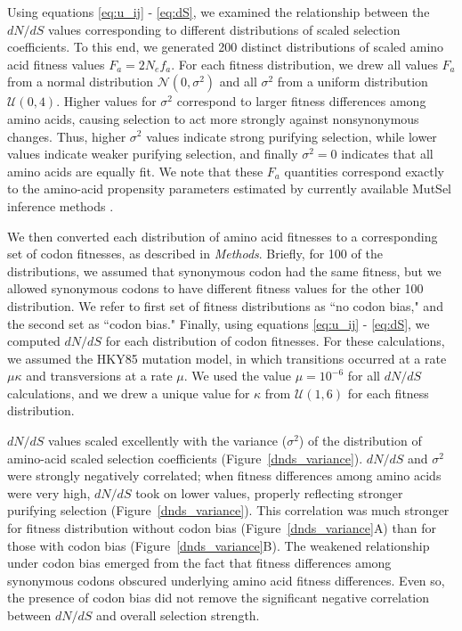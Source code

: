 \documentclass[11pt]{article}
\begin{document}
Using equations \eqref{eq:u_ij} - \eqref{eq:dS}, we examined the relationship between the $dN/dS$ values corresponding to different distributions of scaled selection coefficients. To this end, we generated 200 distinct distributions of scaled amino acid fitness values $F_a = 2N_ef_a$. For each fitness distribution, we drew all values $F_a$ from a normal distribution $\mathcal{N}(0,\sigma^2)$ and all $\sigma^2$ from a uniform distribution $\mathcal{U}(0,4)$. Higher values for $\sigma^2$ correspond to larger fitness differences among amino acids, causing selection to act more strongly against nonsynonymous changes. Thus, higher $\sigma^2$ values indicate strong purifying selection, while lower values indicate weaker purifying selection, and finally $\sigma^2 = 0$ indicates that all amino acids are equally fit. We note that these $F_a$ quantities correspond exactly to the amino-acid propensity parameters estimated by currently available MutSel inference methods \cite{RodrigueLartillot2014,Tamurietal2014}.

We then converted each distribution of amino acid fitnesses to a corresponding set of codon fitnesses, as described in \emph{Methods}. Briefly, for 100 of the distributions, we assumed that synonymous codon had the same fitness, but we allowed synonymous codons to have different fitness values for the other 100 distribution. We refer to first set of fitness distributions as ``no codon bias," and the second set as ``codon bias." Finally, using equations \eqref{eq:u_ij} - \eqref{eq:dS}, we computed $dN/dS$ for each distribution of codon fitnesses. For these calculations, we assumed the HKY85 \cite{HKY85} mutation model, in which transitions occurred at a rate $\mu\kappa$ and transversions at a rate $\mu$. We used the value $\mu = 10^{-6}$ for all $dN/dS$ calculations, and we drew a unique value for $\kappa$ from $\mathcal{U}(1,6)$ for each fitness distribution.

$dN/dS$ values scaled excellently with the variance ($\sigma^2$) of the distribution of amino-acid scaled selection coefficients (Figure~\ref{dnds_variance}). $dN/dS$ and $\sigma^2$ were strongly negatively correlated; when fitness differences among amino acids were very high, $dN/dS$ took on lower values, properly reflecting stronger purifying selection (Figure~\ref{dnds_variance}). This correlation was much stronger for fitness distribution without codon bias (Figure~\ref{dnds_variance}A) than for those with codon bias (Figure~\ref{dnds_variance}B). The weakened relationship under codon bias emerged from the fact that fitness differences among synonymous codons obscured underlying amino acid fitness differences. Even so, the presence of codon bias did not remove the significant negative correlation between $dN/dS$ and overall selection strength.
\end{document}

